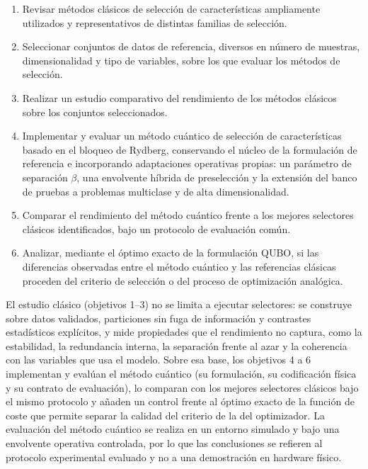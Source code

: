 \begin{enumerate}
\item Revisar métodos clásicos de selección de características
  ampliamente utilizados y representativos de distintas familias de
  selección.
\item Seleccionar conjuntos de datos de referencia, diversos en número
  de muestras, dimensionalidad y tipo de variables, sobre los que
  evaluar los métodos de selección.
\item Realizar un estudio comparativo del rendimiento de los métodos
  clásicos sobre los conjuntos seleccionados.
\item Implementar y evaluar un método cuántico de selección de
  características basado en el bloqueo de Rydberg, conservando el núcleo
  de la formulación de referencia e incorporando adaptaciones operativas
  propias: un parámetro de separación $\beta$, una envolvente híbrida de
  preselección y la extensión del banco de pruebas a problemas
  multiclase y de alta dimensionalidad.
\item Comparar el rendimiento del método cuántico frente a los mejores
  selectores clásicos identificados, bajo un protocolo de evaluación
  común.
\item Analizar, mediante el óptimo exacto de la formulación QUBO, si las
  diferencias observadas entre el método cuántico y las referencias
  clásicas proceden del criterio de selección o del proceso de
  optimización analógica.
\end{enumerate}

El estudio clásico (objetivos 1--3) no se limita a ejecutar selectores:
se construye sobre datos validados, particiones sin fuga de información y
contrastes estadísticos explícitos, y mide propiedades que el rendimiento
no captura, como la estabilidad, la redundancia interna, la separación
frente al azar y la coherencia con las variables que usa el modelo. Sobre
esa base, los objetivos 4 a 6 implementan y evalúan el método cuántico
(su formulación, su codificación física y su contrato de evaluación), lo
comparan con los mejores selectores clásicos bajo el mismo protocolo y
añaden un control frente al óptimo exacto de la función de coste que
permite separar la calidad del criterio de la del optimizador. La
evaluación del método cuántico se realiza en un entorno simulado y bajo
una envolvente operativa controlada, por lo que las conclusiones se
refieren al protocolo experimental evaluado y no a una demostración en
hardware físico.

